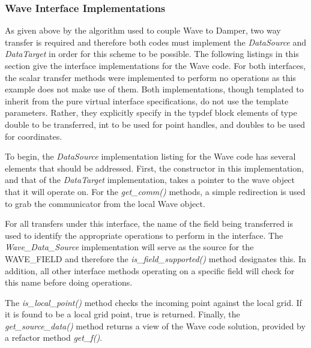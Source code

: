 \documentclass[letterpaper]{article}
\begin{document}
\subsubsection{Wave Interface Implementations}
As given above by the algorithm used to couple Wave to Damper, two way
transfer is required and therefore both codes must implement the {\sl
  DataSource} and {\sl DataTarget} in order for this scheme to be
possible. The following listings in this section give the interface
implementations for the Wave code. For both interfaces, the scalar
transfer methods were implemented to perform no operations as this
example does not make use of them. Both implementations, though
templated to inherit from the pure virtual interface specifications,
do not use the template parameters. Rather, they explicitly specify in
the typdef block elements of type double to be transferred, int to be
used for point handles, and doubles to be used for coordinates.

To begin, the {\sl DataSource} implementation listing for the Wave
code has several elements that should be addressed. First, the
constructor in this implementation, and that of the {\sl DataTarget}
implementation, takes a pointer to the wave object that it will
operate on. For the {\sl get\_comm()} methods, a simple redirection is
used to grab the communicator from the local Wave object. 

For all transfers under this interface, the name of the field being
transferred is used to identify the appropriate operations to perform
in the interface. The {\sl Wave\_Data\_Source} implementation will
serve as the source for the WAVE\_FIELD and therefore the {\sl
  is\_field\_supported()} method designates this. In addition, all
other interface methods operating on a specific field will check for
this name before doing operations.

The {\sl is\_local\_point()} method checks the incoming point
against the local grid. If it is found to be a local grid point, true
is returned. Finally, the {\sl get\_source\_data()} method returns a
view of the Wave code solution, provided by a refactor method {\sl
  get\_f()}. 
\end{document}
